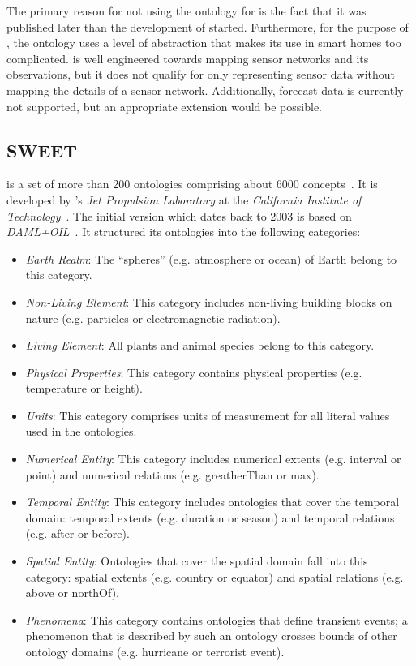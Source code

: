 The primary reason for not using the  ontology for \smarthomeweather is the fact that it was published later than the development of \smarthomeweather started. Furthermore, for the purpose of \smarthomeweather, the  ontology uses a level of abstraction that makes its use in smart homes too complicated.  is well engineered towards mapping sensor networks and its observations, but it does not qualify for only representing sensor data without mapping the details of a sensor network. Additionally, forecast data is currently not supported, but an appropriate extension would be possible.

\subsection{SWEET}
\label{subsec:onto5}

 is a set of more than 200 ontologies comprising about 6000 concepts~\cite{SWEET2,SWEETWeb}. It is developed by 's \emph{Jet Propulsion Laboratory} at the \emph{California Institute of Technology}~\cite{nasa-jpl}. The initial version which dates back to 2003 is based on \emph{DAML+OIL}~\cite{DAML+OIL,SWEET1}. It structured its ontologies into the following categories:
\begin{itemize}
  \item \emph{Earth Realm}: The ``spheres'' (e.g. atmosphere or ocean) of Earth belong to this category.
  \item \emph{Non-Living Element}: This category includes non-living building blocks on nature (e.g. particles or electromagnetic radiation).
  \item \emph{Living Element}: All plants and animal species belong to this category.
  \item \emph{Physical Properties}: This category contains physical properties (e.g. temperature or height).
  \item \emph{Units}: This category comprises units of measurement for all literal values used in the ontologies.
  \item \emph{Numerical Entity}: This category includes numerical extents (e.g. interval or point) and numerical relations (e.g. greatherThan or max).
  \item \emph{Temporal Entity}: This category includes ontologies that cover the temporal domain: temporal extents (e.g. duration or season) and temporal relations (e.g. after or before).
  \item \emph{Spatial Entity}: Ontologies that cover the spatial domain fall into this category: spatial extents (e.g. country or equator) and spatial relations (e.g. above or northOf).
  \item \emph{Phenomena}: This category contains ontologies that define transient events; a phenomenon that is described by such an ontology crosses bounds of other ontology domains (e.g. hurricane or terrorist event).
\end{itemize}

